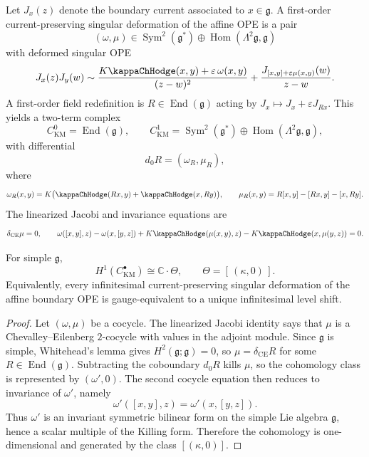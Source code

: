 \begin{construction}\label{cons:boundary-km-complex}
Let $J_x(z)$ denote the boundary current associated to $x\in \mathfrak g$.
A first-order current-preserving singular deformation of the affine OPE is a pair
\[
(\omega,\mu)\in \operatorname{Sym}^2(\mathfrak g^*)\oplus \operatorname{Hom}(\Lambda^2\mathfrak g,\mathfrak g)
\]
with deformed singular OPE
\[
J_x(z)J_y(w)
\sim
\frac{K\kappaChHodge(x,y)+\varepsilon\,\omega(x,y)}{(z-w)^2}
+
\frac{J_{[x,y]+\varepsilon\mu(x,y)}(w)}{z-w}.
\]
A first-order field redefinition is $R\in\operatorname{End}(\mathfrak g)$ acting by
$J_x\mapsto J_x+\varepsilon J_{Rx}$.
This yields a two-term complex
\[
C^0_{\mathrm{KM}} = \operatorname{End}(\mathfrak g),
\qquad
C^1_{\mathrm{KM}} = \operatorname{Sym}^2(\mathfrak g^*)\oplus \operatorname{Hom}(\Lambda^2\mathfrak g,\mathfrak g),
\]
with differential
\[
d_0R = (\omega_R,\mu_R),
\]
where
\[
\omega_R(x,y) = K\bigl(\kappaChHodge(Rx,y)+\kappaChHodge(x,Ry)\bigr),
\qquad
\mu_R(x,y)=R[x,y]-[Rx,y]-[x,Ry].
\]
The linearized Jacobi and invariance equations are
\[
\delta_{\mathrm{CE}}\mu = 0,
\qquad
\omega([x,y],z)-\omega(x,[y,z]) + K\kappaChHodge(\mu(x,y),z)-K\kappaChHodge(x,\mu(y,z))=0.
\]
\end{construction}

\begin{theorem}\label{thm:affine-boundary-line}
For simple $\mathfrak g$,
\[
H^1(C^{\bullet}_{\mathrm{KM}}) \cong \mathbb C\cdot \Theta,
\qquad
\Theta = [\,(\kappa,0)\,].
\]
Equivalently, every infinitesimal current-preserving singular deformation of the affine boundary OPE is
gauge-equivalent to a unique infinitesimal level shift.
\end{theorem}

\begin{proof}
Let $(\omega,\mu)$ be a cocycle. The linearized Jacobi identity says that $\mu$ is a Chevalley--Eilenberg
$2$-cocycle with values in the adjoint module. Since $\mathfrak g$ is simple, Whitehead's lemma gives
$H^2(\mathfrak g;\mathfrak g)=0$, so $\mu=\delta_{\mathrm{CE}}R$ for some $R\in\operatorname{End}(\mathfrak g)$.
Subtracting the coboundary $d_0R$ kills $\mu$, so the cohomology class is represented by $(\omega',0)$.
The second cocycle equation then reduces to invariance of $\omega'$, namely
\[
\omega'([x,y],z)=\omega'(x,[y,z]).
\]
Thus $\omega'$ is an invariant symmetric bilinear form on the simple Lie algebra $\mathfrak g$, hence a scalar
multiple of the Killing form. Therefore the cohomology is one-dimensional and generated by the class
$[(\kappa,0)]$.
\end{proof}

